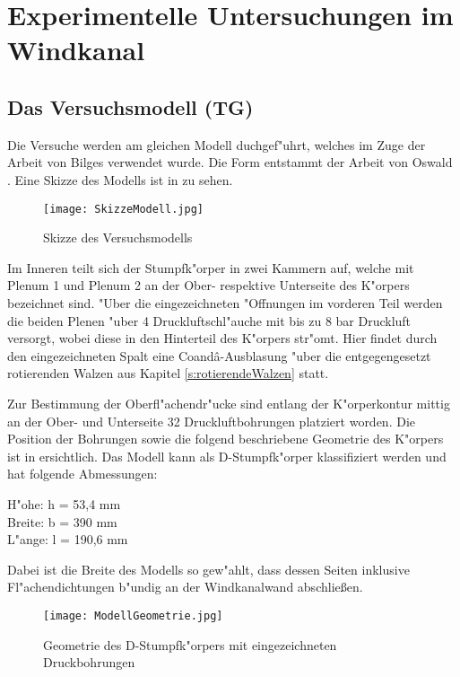 \chapter{Experimentelle Untersuchungen im Windkanal}
\label{s:versuche}
\section{Das Versuchsmodell (TG)}
\label{sec:Modell}
Die Versuche werden am gleichen Modell duchgef"uhrt, welches im Zuge der Arbeit von Bilges \cite{Bilges.2018} verwendet wurde. Die Form entstammt der Arbeit von Oswald \cite{Oswald.2017}. Eine Skizze des Modells ist in  zu sehen.

\begin{figure}[h]
	\centering
	\texttt{[image: SkizzeModell.jpg]}
	\caption{Skizze des Versuchsmodells \citep{Bilges.2018}}
	\label{fig:SkizzeModell}
\end{figure}

Im Inneren teilt sich der Stumpfk"orper in zwei Kammern auf, welche mit Plenum 1 und Plenum 2 an der Ober- respektive Unterseite des K"orpers bezeichnet sind. "Uber die eingezeichneten "Offnungen im vorderen Teil werden die beiden Plenen "uber 4 Druckluftschl"auche mit bis zu 8 bar Druckluft versorgt, wobei diese in den Hinterteil des K"orpers str"omt. Hier findet durch den eingezeichneten Spalt eine Coand\^{a}-Ausblasung "uber die entgegengesetzt rotierenden Walzen aus Kapitel \ref{s:rotierendeWalzen} statt.

Zur Bestimmung der Oberfl"achendr"ucke sind entlang der K"orperkontur mittig an der Ober- und Unterseite 32 Druckluftbohrungen platziert worden. Die Position der Bohrungen sowie die folgend beschriebene Geometrie des K"orpers ist in  ersichtlich. Das Modell kann als D-Stumpfk"orper klassifiziert werden und hat folgende Abmessungen: 
\begin{center}
H"ohe: h = 53,4 mm\\
Breite: b = 390 mm\\
L"ange: l = 190,6 mm\\ 
\end{center}
Dabei ist die Breite des Modells so gew"ahlt, dass dessen Seiten inklusive Fl"achendichtungen b"undig an der Windkanalwand abschlie\ss{}en. 

\begin{figure}[h]
	\centering
	\texttt{[image: ModellGeometrie.jpg]}
	\caption{Geometrie des D-Stumpfk"orpers mit eingezeichneten Druckbohrungen \citep{Bilges.2018}}
	\label{fig:ModellGeometrie}
\end{figure}

